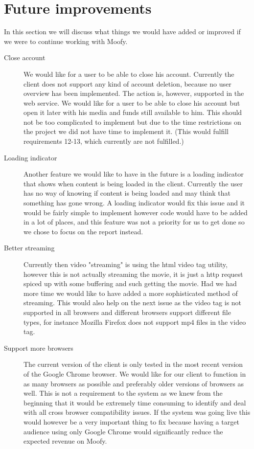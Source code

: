 \section{Future improvements}
\label{sec:futureimps}
In this section we will discuss what things we would have added or improved if we were to continue working with Moofy.

\begin{description}
\item[Close account] We would like for a user to be able to close his account.
Currently the client does not support any kind of account deletion, because no
user overview has been implemented. The action is, however, supported in the
web service. We would like for a user to be able to close his account but open
it later with his media and funds still available to him. This should not be
too complicated to implement but due to the time restrictions on the project we
did not have time to implement it. (This would fulfill requirements 12-13,
which currently are not fulfilled.)

\item[Loading indicator] Another feature we would like to have in the future is
a loading indicator that shows when content is being loaded in the client.
Currently the user has no way of knowing if content is being loaded and may
think that something has gone wrong. A loading indicator would fix this issue
and it would be fairly simple to implement however code would have to be added
in a lot of places, and this feature was not a priority for us to get done so
we chose to focus on the report instead.

\item[Better streaming] Currently then video "streaming" is using the html
video tag utility, however this is not actually streaming the movie, it is just
a http request spiced up with some buffering and such getting the movie. Had we
had more time we would like to have added a more sophisticated method of
streaming. This would also help on the next issue as the video tag is not
supported in all browsers and different browsers support different file types,
for instance Mozilla Firefox does not support mp4 files in the video tag.

\item[Support more browsers] The current version of the client is only tested
in the most recent version of the Google Chrome browser. We would like for our
client to function in as many browsers as possible and preferably older
versions of browsers as well. This is not a requirement to the system as we
knew from the beginning that it would be extremely time consuming to identify
and deal with all cross browser compatibility issues. If the system was going
live this would however be a very important thing to fix because having a
target audience using only Google Chrome would significantly reduce the
expected revenue on Moofy.
\end{description}
